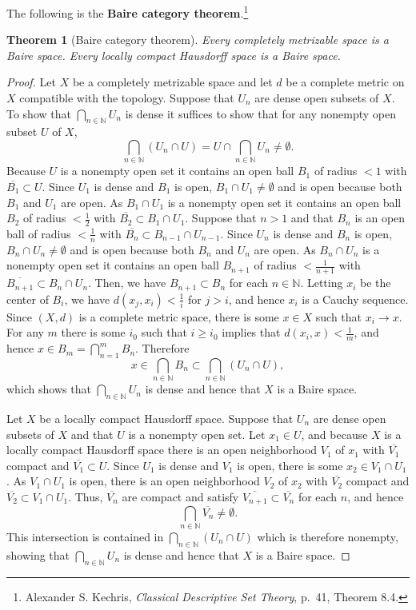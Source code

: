 \documentclass{article}
\newtheorem{theorem}{Theorem}
\theoremstyle{definition}
\begin{document}
The following is the \textbf{Baire category theorem}.\footnote{Alexander S. Kechris, {\em Classical Descriptive Set Theory}, p.~41, Theorem
8.4.}

\begin{theorem}[Baire category theorem]
Every completely metrizable space is a Baire space. Every locally compact Hausdorff space is a Baire space.
\end{theorem}
\begin{proof}
Let  $X$ be a completely metrizable space and let $d$ be a complete metric on $X$ compatible with the topology. 
Suppose that $U_n$ are dense open subsets of $X$. To show that $\bigcap_{n \in \mathbb{N}} U_n$ is dense it suffices
to show that for any nonempty open subset $U$ of $X$,
\[
\bigcap_{n \in \mathbb{N}} (U_n \cap U) = U \cap \bigcap_{n \in \mathbb{N}} U_n \neq \emptyset. 
\]
Because $U$ is a nonempty open set it contains an open ball $B_1$ of radius $<1$ with $\overline{B_1} \subset U$. 
Since $U_1$ is dense and $B_1$ is open, $B_1 \cap U_1 \neq \emptyset$ and is open because both $B_1$ and $U_1$ are open.
As $B_1 \cap U_1$ is a nonempty open set it contains an open ball $B_2$ of radius $<\frac{1}{2}$ with
$\overline{B_2} \subset B_1 \cap U_1$. Suppose that $n>1$ and that $B_n$ is an open ball of radius $<\frac{1}{n}$ with
$\overline{B_n} \subset B_{n-1} \cap U_{n-1}$. Since $U_n$ is dense and $B_n$ is open,
$B_n \cap U_n \neq \emptyset$ and is open because both $B_n$ and $U_n$ are open.
As $B_n \cap U_n$ is a nonempty open set it contains an open ball $B_{n+1}$ of radius $<\frac{1}{n+1}$ with
$\overline{B_{n+1}} \subset B_n \cap U_n$. Then, we have $B_{n+1} \subset B_n$ for each $n \in \mathbb{N}$. 
Letting $x_i$ be the center of $B_i$, we have $d(x_j,x_i)<\frac{1}{i}$ for $j >i$, and hence $x_i$ is a Cauchy sequence.
Since $(X,d)$ is a complete metric space, there is some $x \in X$ such that $x_i \to x$. For
any $m$ there is some $i_0$ such that $i \geq i_0$ implies that
$d(x_i,x)<\frac{1}{m}$, and hence 
$x \in B_m = \bigcap_{n=1}^m B_n$. Therefore
\[
x \in \bigcap_{n \in \mathbb{N}} B_n \subset \bigcap_{n \in \mathbb{N}} (U_n \cap U),
\]
which shows that $\bigcap_{n \in \mathbb{N}} U_n$ is dense and hence that $X$ is a Baire space.


Let  $X$ be a locally compact Hausdorff space.  Suppose that $U_n$ are dense
open subsets of $X$ and that $U$ is a nonempty open set.  
Let $x_1 \in U$, and because $X$ is a locally compact Hausdorff space there is an open neighborhood
$V_1$ of $x_1$ with $\overline{V_1}$ compact and $\overline{V_1} \subset U$. 
Since $U_1$ is dense and $V_1$ is open, there is some $x_2 \in V_1 \cap U_1$.
As $V_1 \cap U_1$ is open, there is an open neighborhood $V_2$ of $x_2$ with $\overline{V_2}$ compact and 
$\overline{V_2} \subset V_1 \cap U_1$. Thus, $\overline{V_n}$ are compact and satisfy 
$\overline{V_{n+1}} \subset \overline{V_n}$ for each $n$, and
hence
\[
\bigcap_{n \in \mathbb{N}} \overline{V_n} \neq \emptyset. 
\]
This intersection is contained in $\bigcap_{n \in \mathbb{N}} (U_n \cap U)$ which is therefore nonempty,
showing that $\bigcap_{n \in \mathbb{N}} U_n$
is dense and hence that $X$ is a Baire space.
\end{proof} 
\end{document}
